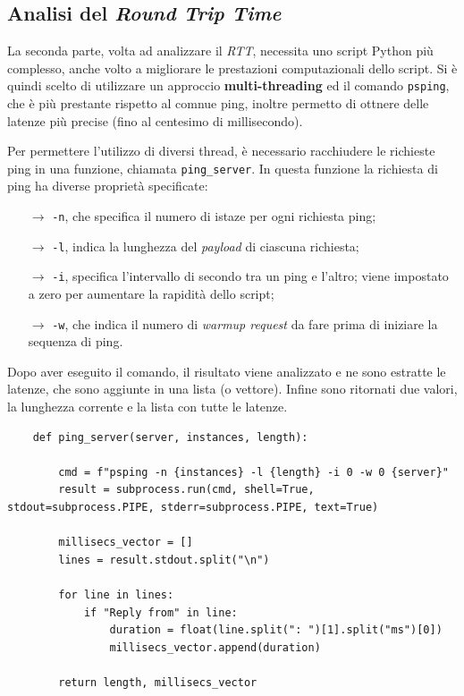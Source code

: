 \vspace{15px}\subsection{Analisi del \textsl{Round Trip Time}}\label{RTT}

La seconda parte, volta ad analizzare il \textsl{RTT}, necessita uno script Python più complesso, anche volto a migliorare le prestazioni computazionali dello script. Si è quindi scelto di utilizzare un approccio \textbf{multi-threading} ed il comando \texttt{psping}, che è più prestante rispetto al comnue ping, inoltre permetto di ottnere delle latenze più precise (fino al centesimo di millisecondo).

Per permettere l'utilizzo di diversi thread, è necessario racchiudere le richieste ping in una funzione, chiamata \texttt{ping\_server}. In questa funzione la richiesta di ping ha diverse proprietà specificate:
\vspace{-3px}
\begin{itemize}
    \setlength{\itemsep}{-2px}
    \item[$\to$] \texttt{-n}, che specifica il numero di istaze per ogni richiesta ping;
    \item[$\to$] \texttt{-l}, indica la lunghezza del \textsl{payload} di ciascuna richiesta;
    \item[$\to$] \texttt{-i}, specifica l'intervallo di secondo tra un ping e l'altro; viene impostato a zero per aumentare la rapidità dello script;
    \item[$\to$] \texttt{-w}, che indica il numero di \textsl{warmup request} da fare prima di iniziare la sequenza di ping.
\end{itemize}
\noindent Dopo aver eseguito il comando, il risultato viene analizzato e ne sono estratte le latenze, che sono aggiunte in una lista (o vettore). Infine sono ritornati due valori, la lunghezza corrente e la lista con tutte le latenze.

\begin{lstlisting}
    def ping_server(server, instances, length):

        cmd = f"psping -n {instances} -l {length} -i 0 -w 0 {server}"
        result = subprocess.run(cmd, shell=True, stdout=subprocess.PIPE, stderr=subprocess.PIPE, text=True)

        millisecs_vector = []
        lines = result.stdout.split("\n")
        
        for line in lines:
            if "Reply from" in line:
                duration = float(line.split(": ")[1].split("ms")[0])
                millisecs_vector.append(duration)
        
        return length, millisecs_vector
\end{lstlisting}

